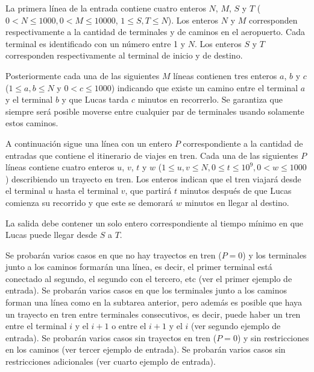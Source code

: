 \documentclass{oci}
\begin{document}
\begin{inputDescription}
  La primera línea de la entrada contiene cuatro enteros $N$, $M$, $S$ y $T$
  ($0 < N\leq 1000, 0 < M \leq 10000$, $1 \leq S, T\leq N$).
  Los enteros $N$ y $M$ corresponden respectivamente a la cantidad de terminales
  y de caminos en el aeropuerto.
  Cada terminal es identificado con un número entre 1 y $N$.
  Los enteros $S$ y $T$ corresponden respectivamente al terminal de inicio y de
  destino.

  Posteriormente cada una de las siguientes $M$ líneas contienen tres enteros
  $a$, $b$ y $c$ ($1\leq a, b\leq N$ y $0<c\leq 1000$) indicando que existe un
  camino entre el terminal $a$ y el terminal $b$ y que Lucas tarda $c$ minutos
  en recorrerlo.
  Se garantiza que siempre será posible moverse entre cualquier par de
  terminales usando solamente estos caminos.

  A continuación sigue una línea con un entero $P$ correspondiente a la
  cantidad de entradas que contiene el itinerario de viajes en tren.
  Cada una de las siguientes $P$ líneas contiene cuatro enteros $u$, $v$,
  $t$ y $w$ ($1 \leq u,v \leq N, 0\leq t\leq 10^9, 0 < w \leq 1000$)
  describiendo un trayecto en tren. 
  Los enteros indican que el tren viajará desde el terminal $u$ hasta el
  terminal $v$, que partirá $t$ minutos después de que Lucas comienza su
  recorrido y que este se demorará $w$ minutos en llegar al destino.
\end{inputDescription}

\begin{outputDescription}
  La salida debe contener un solo entero correspondiente al tiempo mínimo en que
  Lucas puede llegar desde $S$ a $T$.
\end{outputDescription}

\begin{scoreDescription}
   Se probarán varios casos en que no hay trayectos en tren ($P=0$) y
  los terminales junto a los caminos formarán una línea, es decir, el primer
  terminal está conectado al segundo, el segundo con el tercero, etc (ver
  el primer ejemplo de entrada). 
   Se probarán varios casos en que los terminales junto a los caminos
  forman una línea como en la subtarea anterior, pero además es posible que haya
  un trayecto en tren entre terminales consecutivos, es decir, puede haber un
  tren entre el terminal $i$ y el $i+1$ o entre el $i+1$ y el $i$ (ver segundo
  ejemplo de entrada).
   Se probarán varios casos sin trayectos en tren ($P=0$) y sin
  restricciones en los caminos (ver tercer ejemplo de entrada).
   Se probarán varios casos sin restricciones adicionales (ver cuarto
  ejemplo de entrada).
\end{scoreDescription}

\begin{sampleDescription}
\end{sampleDescription}
\end{document}
